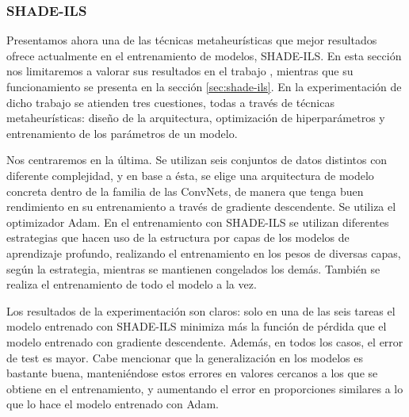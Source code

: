\subsubsection{SHADE-ILS}

Presentamos ahora una de las técnicas metaheurísticas que mejor resultados ofrece actualmente en el entrenamiento de modelos, SHADE-ILS. En esta sección nos limitaremos a valorar sus resultados en el trabajo \cite{MHtrainingClase}, mientras que su funcionamiento se presenta en la sección \ref{sec:shade-ils}. En la experimentación de dicho trabajo se atienden tres cuestiones, todas a través de técnicas metaheurísticas: diseño de la arquitectura, optimización de hiperparámetros y entrenamiento de los parámetros de un modelo. 

Nos centraremos en la última. Se utilizan seis conjuntos de datos distintos con diferente complejidad, y en base a ésta, se elige una arquitectura de modelo concreta dentro de la familia de las ConvNets, de manera que tenga buen rendimiento en su entrenamiento a través de gradiente descendente. Se utiliza el optimizador Adam. En el entrenamiento con SHADE-ILS se utilizan diferentes estrategias que hacen uso de la estructura por capas de los modelos de aprendizaje profundo, realizando el entrenamiento en los pesos de diversas capas, según la estrategia, mientras se mantienen congelados los demás. También se realiza el entrenamiento de todo el modelo a la vez.

Los resultados de la experimentación son claros: solo en una de las seis tareas el modelo entrenado con SHADE-ILS minimiza más la función de pérdida que el modelo entrenado con gradiente descendente. Además, en todos los casos, el error de test es mayor. Cabe mencionar que la generalización en los modelos es bastante buena, manteniéndose estos errores en valores cercanos a los que se obtiene en el entrenamiento, y aumentando el error en proporciones similares a lo que lo hace el modelo entrenado con Adam.


